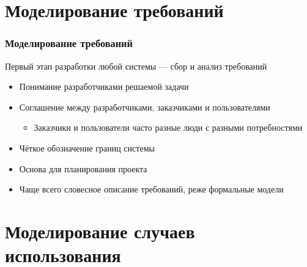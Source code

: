 \documentclass{../cscslides}
\begin{document}
    \frame{\titlepage}

    \section{Моделирование требований}

    \begin{frame}
        \frametitle{Моделирование требований}
        Первый этап разработки любой системы --- сбор и анализ требований
        \begin{itemize}
            \item Понимание разработчиками решаемой задачи
            \item Соглашение между разработчиками, заказчиками и пользователями
            \begin{itemize}
                \item Заказчики и пользователи часто разные люди с разными потребностями
            \end{itemize}
            \item Чёткое обозначение границ системы
            \item Основа для планирования проекта
            \item Чаще всего словесное описание требований, реже формальные модели
        \end{itemize}
    \end{frame}

    \section{Моделирование случаев использования}
    
\end{document}
